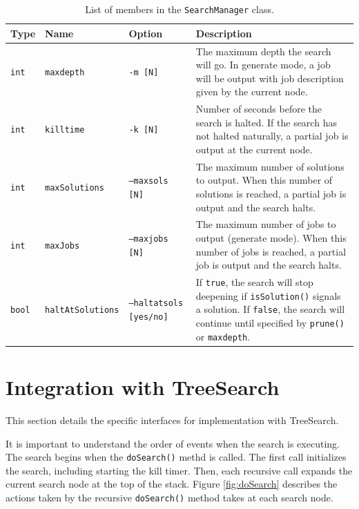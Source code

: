 \documentclass[11pt]{article}
\def\TreeSearch{{TreeSearch}}
\begin{document}
	
\begin{table}[htb]\centering
	\small
\begin{tabular}[H]{|lll|p{2.5in}|}
	\hline
	Type & Name & Option & Description\\
	\hline
	\texttt{int} & \texttt{maxdepth} & \texttt{-m [N]} &
		The maximum depth the search will go.  
		In generate mode, a job will be output with
		job description given by the current node. \\
	\hline
	\texttt{int} & \texttt{killtime} & \texttt{-k [N]} &
		Number of seconds before the search is halted.  
		If the search has not halted naturally, a partial job is output at the current node.\\
	\hline
	\texttt{int} & \texttt{maxSolutions} & \texttt{--maxsols [N]} &
		The maximum number of solutions to output.  
		When this number of solutions is reached, a partial job is output and the search halts.\\
	\hline
	\texttt{int} & \texttt{maxJobs} & \texttt{--maxjobs [N]} &
		The maximum number of jobs to output (generate mode).  
		When this number of jobs is reached, a partial job is output and the search halts.\\
	\hline
	\texttt{bool} & \texttt{haltAtSolutions} & \texttt{--haltatsols [yes/no]} &
	If \texttt{true}, the search will stop deepening if \texttt{isSolution()} signals a solution. 
	If \texttt{false}, the search will continue until specified by \texttt{prune()} or \texttt{maxdepth}.\\
	\hline
\end{tabular}
\caption{\label{tbl:members}List of members in the \texttt{SearchManager} class.}
\end{table}



\section{Integration with \TreeSearch}
\label{sec:Integration}

This section details the specific interfaces for
	implementation with {\TreeSearch}.

It is important to understand the order of events
	when the search is executing.
The search begins when the \texttt{doSearch()} methd
	is called.
The first call initializes the search, including
	starting the kill timer.
Then, each recursive call expands the current search node
	at the top of the stack.
Figure \ref{fig:doSearch} describes the actions
	taken by the recursive \texttt{doSearch()} 
	method takes at each search node.
	
\end{document}
